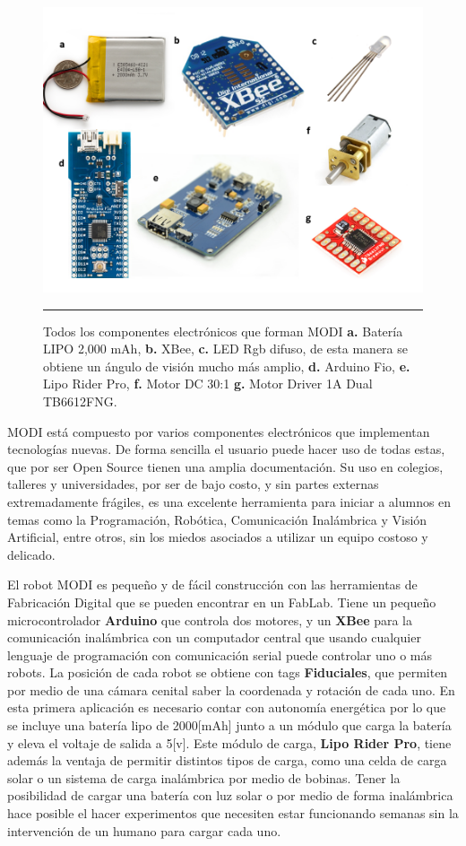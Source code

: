 \begin{figure}[htbp]
	\centering
		\includegraphics[width=\textwidth]{./Figures/MODI/compElo.png}
		\rule{35em}{0.5pt}
	\caption[Componentes Electrónicos]{Todos los componentes electrónicos que forman MODI \textbf{ a.} Batería LIPO 2,000 mAh, \textbf{b.} XBee, \textbf{c.} LED Rgb difuso, de esta manera se obtiene un ángulo de visión mucho más amplio, \textbf{d.} Arduino Fio, \textbf{e.} Lipo Rider Pro,\textbf{ f.} Motor DC 30:1 \textbf{g.} Motor Driver 1A Dual TB6612FNG.}
	\label{fig:compELO}
\end{figure}

MODI está compuesto por varios componentes electrónicos que implementan tecnologías nuevas. De forma sencilla el usuario puede hacer uso de todas estas, que por ser Open Source tienen una amplia documentación. Su uso en colegios, talleres y universidades, por ser de bajo costo, y sin partes externas extremadamente frágiles, es una excelente herramienta para iniciar a alumnos en temas como la Programación, Robótica, Comunicación Inalámbrica y Visión Artificial, entre otros, sin los miedos asociados a utilizar un equipo costoso y delicado.

El robot MODI es pequeño y de fácil construcción con las herramientas de Fabricación Digital que se pueden encontrar en un FabLab. Tiene un pequeño microcontrolador \textbf{Arduino} que controla dos motores, y un \textbf{XBee} para la comunicación inalámbrica con un computador central que usando cualquier lenguaje de programación con comunicación serial puede controlar uno o más robots. La posición de cada robot se obtiene con tags \textbf{Fiduciales}, que permiten por medio de una cámara cenital saber la coordenada y rotación de cada uno. En esta primera aplicación es necesario contar con autonomía energética por lo que se incluye una batería lipo de 2000[mAh] junto a un módulo que carga la batería y eleva el voltaje de salida a 5[v]. Este módulo de carga, \textbf{Lipo Rider Pro}, tiene además la ventaja de permitir distintos tipos de carga, como una celda de carga solar o un sistema de carga inalámbrica por medio de bobinas. Tener la posibilidad de cargar una batería con luz solar o por medio de forma inalámbrica hace posible el hacer experimentos que necesiten estar funcionando semanas sin la intervención de un humano para cargar cada uno.

